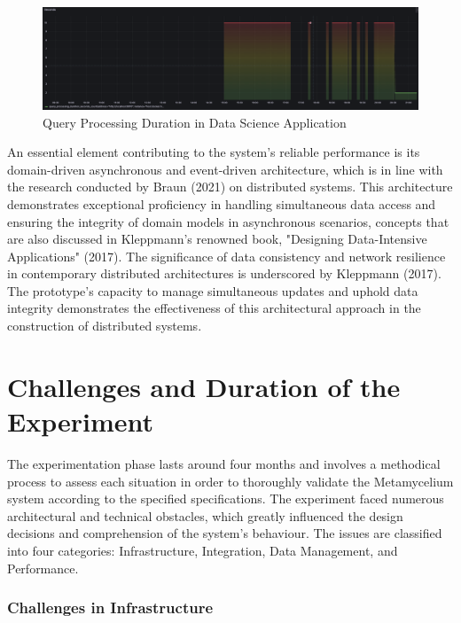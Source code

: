 \documentclass[preprint,12pt]{elsarticle}
\begin{document}
\begin{figure}[h]
  \centering
  \includegraphics[width=\textwidth]{images/query-processing-duration-in-data-science-application.png}
  \caption{Query Processing Duration in Data Science Application}
  \label{queryProcessingDurationInDataScienceApplication}
\end{figure}


An essential element contributing to the system's reliable performance is its domain-driven asynchronous and event-driven architecture, which is in line with the research conducted by Braun (2021) on distributed systems. This architecture demonstrates exceptional proficiency in handling simultaneous data access and ensuring the integrity of domain models in asynchronous scenarios, concepts that are also discussed in Kleppmann's renowned book, "Designing Data-Intensive Applications" (2017). The significance of data consistency and network resilience in contemporary distributed architectures is underscored by Kleppmann (2017). The prototype's capacity to manage simultaneous updates and uphold data integrity demonstrates the effectiveness of this architectural approach in the construction of distributed systems.


\section{Challenges and Duration of the Experiment}

The experimentation phase lasts around four months and involves a methodical process to assess each situation in order to thoroughly validate the Metamycelium system according to the specified specifications. The experiment faced numerous architectural and technical obstacles, which greatly influenced the design decisions and comprehension of the system's behaviour. The issues are classified into four categories: Infrastructure, Integration, Data Management, and Performance.

\subsubsection{Challenges in Infrastructure} 
\end{document}
